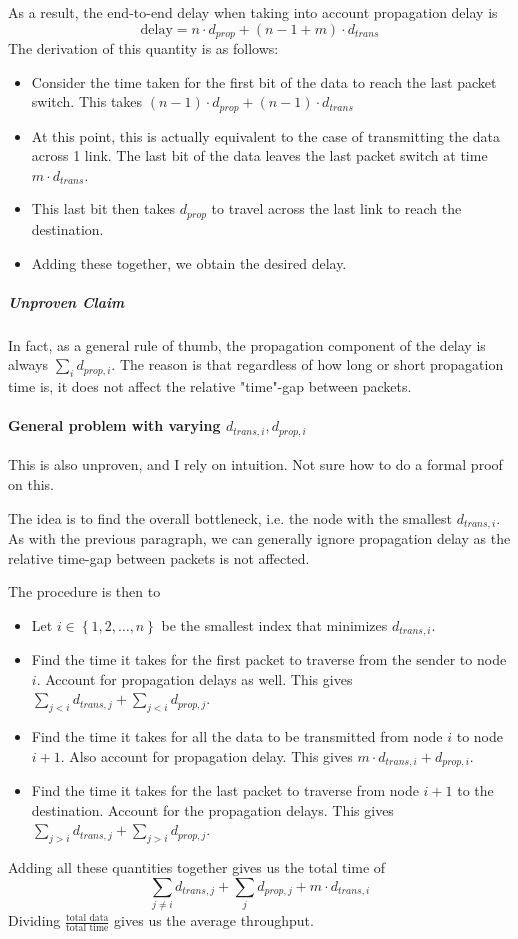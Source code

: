 \documentclass[a4paper]{article}
\newcommand{\set}[1]{\left\lbrace#1\right\rbrace} %
\newcommand{\enum}[1]{1,2,\dots,#1}
\begin{document}
As a result, the end-to-end delay when taking into account propagation delay is
\begin{equation}
	\text{delay} = n\cdot d_{prop} + (n - 1 + m)\cdot d_{trans}
\end{equation}
The derivation of this quantity is as follows:
\begin{itemize}
	\item Consider the time taken for the first bit of the data to reach the last packet switch. This takes $(n-1)\cdot d_{prop} + (n-1)\cdot d_{trans}$
	\item At this point, this is actually equivalent to the case of transmitting the data across 1 link. The last bit of the data leaves the last packet switch at time $m\cdot d_{trans}$.
	\item This last bit then takes $d_{prop}$ to travel across the last link to reach the destination.
	\item Adding these together, we obtain the desired delay.
\end{itemize}

\subparagraph{Unproven Claim}
In fact, as a general rule of thumb, the propagation component of the delay is always $\sum_i d_{prop, i}$. The reason is that regardless of how long or short propagation time is, it does not affect the relative "time"-gap between packets.

\paragraph{General problem with varying $d_{trans,i}, d_{prop,i}$} This is also unproven, and I rely on intuition. Not sure how to do a formal proof on this.

The idea is to find the overall bottleneck, i.e. the node with the smallest $d_{trans, i}$. As with the previous paragraph, we can generally ignore propagation delay as the relative time-gap between packets is not affected.

The procedure is then to
\begin{itemize}
	\item Let $i\in \set{\enum{n}}$ be the smallest index that minimizes $d_{trans, i}$.
	\item Find the time it takes for the first packet to traverse from the sender to node $i$. Account for propagation delays as well. This gives $\sum_{j<i}d_{trans,j} + \sum_{j < i}d_{prop, j}$.
	\item Find the time it takes for all the data to be transmitted from node $i$ to node $i+1$. Also account for propagation delay. This gives $m\cdot d_{trans,i} + d_{prop,i}$.
	\item Find the time it takes for the last packet to traverse from node $i+1$ to the destination. Account for the propagation delays. This gives $\sum_{j > i}d_{trans, j} + \sum_{j > i}d_{prop, j}$.
\end{itemize}
Adding all these quantities together gives us the total time of
\begin{equation}
	\sum_{j\neq i}d_{trans,j} + \sum_j d_{prop,j} + m\cdot d_{trans,i}
\end{equation}
Dividing $\frac{\text{total data}}{\text{total time}}$ gives us the average throughput.
\end{document}
